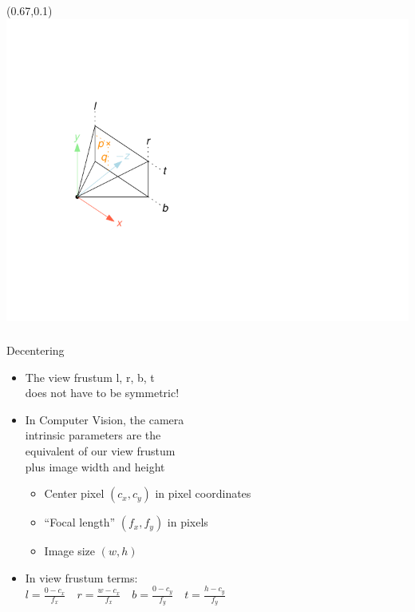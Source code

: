 \documentclass[utf8,stillsansserifmath,fleqn,t]{beamer}
\begin{document}
\begin{frame}
\begin{textblock}{0.35}(0.67,0.1)\includegraphics[width=\textwidth]{./fig/camera.pdf}\end{textblock}
\frametitle{\insertsection}
Decentering
\begin{itemize}
\item The view frustum l, r, b, t\\ does not have to be symmetric!
\item In Computer Vision, the camera\\ intrinsic parameters are the\\ equivalent of
our view frustum\\ plus image width and height
\begin{itemize}
\item Center pixel $(c_x,c_y)$ in pixel coordinates
\item ``Focal length'' $(f_x,f_y)$ in pixels
\item Image size $(w,h)$
\end{itemize}
\item In view frustum terms:\\
$
l = \frac{0 - c_x}{f_x}\quad
r = \frac{w - c_x}{f_x}\quad
b = \frac{0 - c_y}{f_y}\quad
t = \frac{h - c_y}{f_y}\quad
$
\end{itemize}
\end{frame}
\end{document}
